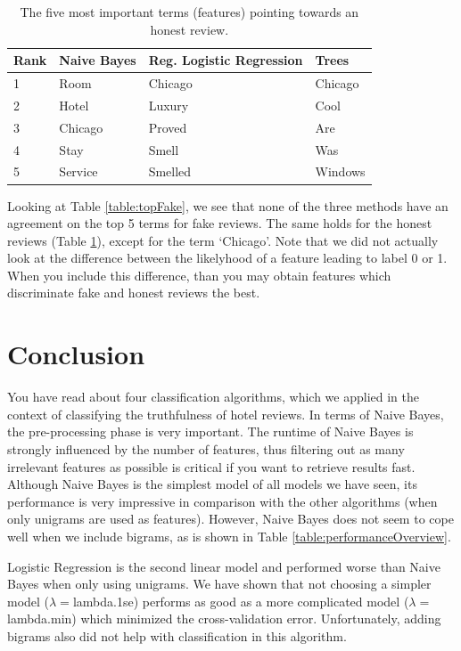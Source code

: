 \documentclass[a4paper,11pt]{article}
\begin{document}
\begin{table}[H]
\centering
\caption{The five most important terms (features) pointing towards an honest review.}
\label{table:topHonest}
\begin{tabular}{|l|l|l|l|}
\hline
Rank & Naive Bayes & Reg. Logistic Regression & Trees \\
\hline
1 & Room    &  Chicago &  Chicago \\ 
2 & Hotel   &  Luxury  &  Cool \\
3 & Chicago &  Proved  &  Are\\
4 & Stay    &  Smell  &  Was\\
5 & Service &  Smelled  &  Windows\\
\hline
\end{tabular}
\end{table}

Looking at Table \ref{table:topFake}, we see that none of the three methods have an agreement on the top 5 terms for fake reviews. The same holds for the honest reviews (Table \ref{table:topHonest}), except for the term `Chicago'. Note that we did not actually look at the difference between the likelyhood of a feature leading to label 0 or 1. When you include this difference, than you may obtain features which discriminate fake and honest reviews the best.

\section{Conclusion}
You have read about four classification algorithms, which we applied in the context of classifying the truthfulness of hotel reviews. In terms of Naive Bayes, the pre-processing phase is very important. The runtime of Naive Bayes is strongly influenced by the number of features, thus filtering out as many irrelevant features as possible is critical if you want to retrieve results fast. Although Naive Bayes is the simplest model of all models we have seen, its performance is very impressive in comparison with the other algorithms (when only unigrams are used as features). However, Naive Bayes does not seem to cope well when we include bigrams, as is shown in Table \ref{table:performanceOverview}.

Logistic Regression is the second linear model and performed worse than Naive Bayes when only using unigrams. We have shown that not choosing a simpler model ($\lambda=$lambda.1se) performs as good as a more complicated model ($\lambda=$lambda.min) which minimized the cross-validation error. Unfortunately, adding bigrams also did not help with classification in this algorithm.
\end{document}
